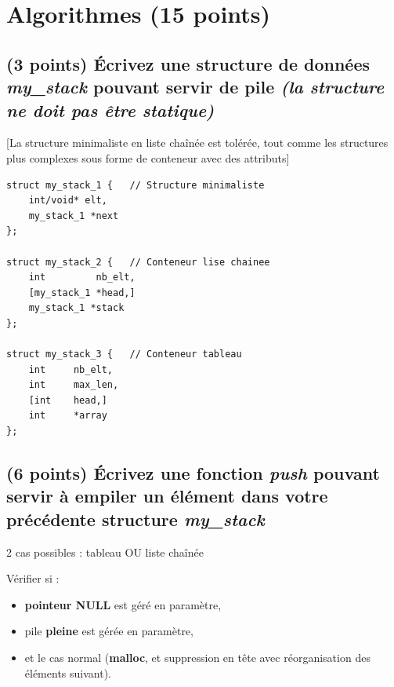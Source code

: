 \documentclass[11pt,a4paper]{article}
\begin{document}
%
\section{Algorithmes (15 points)}

\subsection{(3 points) \'Ecrivez une structure de données \og \textit{my\_stack} \fg{} pouvant servir de pile \textit{(la structure ne doit pas être statique)} }

\bigskip

\begin{center}
[La structure minimaliste en liste chaînée est tolérée, tout comme les structures plus complexes sous forme de conteneur avec des attributs]
\end{center}

\lstset{language=c}
\begin{lstlisting}[frame=single]
struct my_stack_1 {   // Structure minimaliste
	int/void* elt,
	my_stack_1 *next
};

struct my_stack_2 {   // Conteneur lise chainee
	int			nb_elt,
	[my_stack_1 *head,]
	my_stack_1 *stack
};

struct my_stack_3 {   // Conteneur tableau
	int		nb_elt,
	int		max_len,
	[int	head,]
	int		*array
};
\end{lstlisting}

\bigskip


\newpage

\subsection{(6 points) \'Ecrivez une fonction \og \textit{push} \fg{} pouvant servir à empiler un élément dans votre précédente structure \og \textit{my\_stack} \fg{} }

\bigskip

\begin{center}


\vspace{2cm}

2 cas possibles : tableau OU liste chaînée

\bigskip

Vérifier si :
\begin{itemize}
\item \textbf{pointeur NULL} est géré en paramètre,
\item pile \textbf{pleine} est gérée en paramètre,
\item et le cas normal (\textbf{malloc}, et suppression en tête avec réorganisation des éléments suivant).
\end{itemize}
\end{center}
\end{document}
